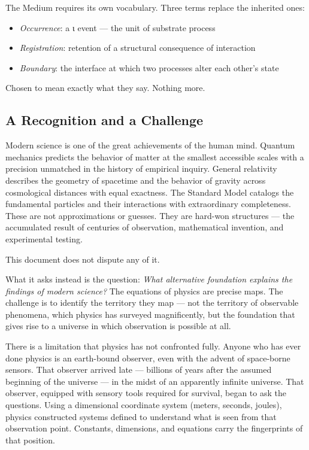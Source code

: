 \documentclass[11pt,letterpaper]{article}
\begin{document}
The Medium requires its own vocabulary. Three terms replace the inherited ones:

\begin{itemize}
\item \emph{Occurrence}: a ι event — the unit of substrate process
\item \emph{Registration}: retention of a structural consequence of interaction
\item \emph{Boundary}: the interface at which two processes alter each other's state
\end{itemize}

Chosen to mean exactly what they say. Nothing more.

\subsection{A Recognition and a Challenge}
\label{sec:orgeaea03d}

Modern science is one of the great achievements of the human mind. Quantum mechanics predicts the behavior of matter at the smallest accessible scales with a precision unmatched in the history of empirical inquiry. General relativity describes the geometry of spacetime and the behavior of gravity across cosmological distances with equal exactness. The Standard Model catalogs the fundamental particles and their interactions with extraordinary completeness. These are not approximations or guesses. They are hard-won structures --- the accumulated result of centuries of observation, mathematical invention, and experimental testing.

This document does not dispute any of it.

What it asks instead is the question: \emph{What alternative foundation explains the findings of modern science?} The equations of physics are precise maps. The challenge is to identify the territory they map --- not the territory of observable phenomena, which physics has surveyed magnificently, but the foundation that gives rise to a universe in which observation is possible at all.

There is a limitation that physics has not confronted fully. Anyone who has ever done physics is an earth-bound observer, even with the advent of space-borne sensors. That observer arrived late --- billions of years after the assumed beginning of the universe --- in the midst of an apparently infinite universe. That observer, equipped with sensory tools required for survival, began to ask the questions. Using a dimensional coordinate system (meters, seconds, joules), physics constructed systems defined to understand what is seen from that observation point. Constants, dimensions, and equations carry the fingerprints of that position.
\end{document}
